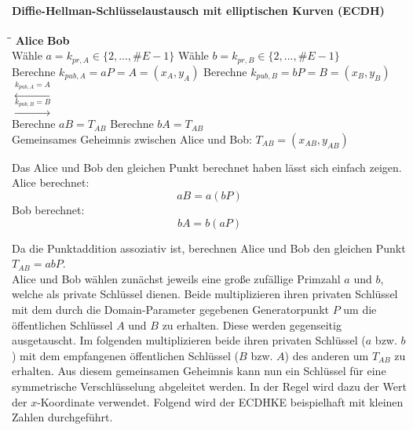 \paragraph{Diffie-Hellman-Schlüsselaustausch mit elliptischen Kurven (ECDH)}
\begin{tabbing}
\qquad \qquad \qquad \qquad \qquad \qquad \qquad \qquad \= \qquad \qquad \qquad \= \qquad \qquad \qquad \qquad \qquad \qquad \qquad \qquad \kill
\textbf{Alice} \> \> \textbf{Bob}\\
Wähle $a=k_{pr,A} \in \{2,..., \#E-1\}$ \> \> Wähle $b=k_{pr,B} \in \{2,..., \#E-1\}$\\
Berechne $k_{pub,A} = aP = A = (x_A,y_A)$ \> \> Berechne $k_{pub,B} = bP = B = (x_B, y_B)$\\
\> $\xleftarrow{k_{pub,A} = A}$ \> \\
\> $\xrightarrow{k_{pub,B} = B}$ \> \\
Berechne $aB = T_{AB}$ \> \> Berechne $bA = T_{AB}$\\
Gemeinsames Geheimnis zwischen Alice und Bob: $T_{AB} = (x_{AB}, y_{AB})$\\
\end{tabbing}
Das Alice und Bob den gleichen Punkt berechnet haben lässt sich einfach zeigen.\\

Alice berechnet: $$aB = a(bP)$$
Bob berechnet: $$bA = b(aP)$$

Da die Punktaddition assoziativ ist, berechnen Alice und Bob den gleichen Punkt $T_{AB} = abP$.\\

Alice und Bob wählen zunächst jeweils eine große zufällige Primzahl $a$ und $b$, welche als private Schlüssel dienen. Beide multiplizieren ihren privaten Schlüssel mit dem durch die Domain-Parameter gegebenen Generatorpunkt $P$ um die öffentlichen Schlüssel $A$ und $B$ zu erhalten. Diese werden gegenseitig ausgetauscht. Im folgenden multiplizieren beide ihren privaten Schlüssel ($a$ bzw. $b$) mit dem empfangenen öffentlichen Schlüssel ($B$ bzw. $A$) des anderen um $T_{AB}$ zu erhalten. Aus diesem gemeinsamen Geheimnis kann nun ein Schlüssel für eine symmetrische Verschlüsselung abgeleitet werden. In der Regel wird dazu der Wert der $x$-Koordinate verwendet. Folgend wird der ECDHKE beispielhaft mit kleinen Zahlen durchgeführt.\\

